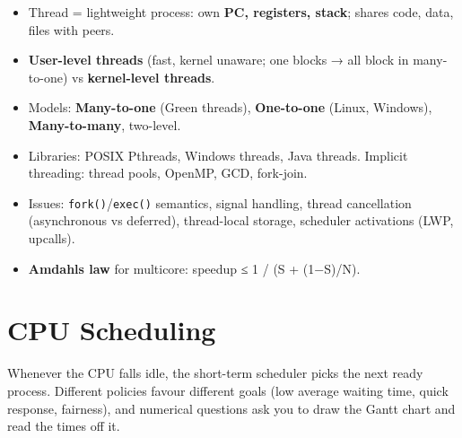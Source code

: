 \begin{itemize}
\tightlist
\item
  Thread = lightweight process: own \textbf{PC, registers, stack}; shares code, data, files with peers.
\item
  \textbf{User-level threads} (fast, kernel unaware; one blocks → all block in many-to-one) vs \textbf{kernel-level threads}.
\item
  Models: \textbf{Many-to-one} (Green threads), \textbf{One-to-one} (Linux, Windows), \textbf{Many-to-many}, two-level.
\item
  Libraries: POSIX Pthreads, Windows threads, Java threads. Implicit threading: thread pools, OpenMP, GCD, fork-join.
\item
  Issues: \texttt{fork()}/\texttt{exec()} semantics, signal handling, thread cancellation (asynchronous vs deferred), thread-local storage, scheduler activations (LWP, upcalls).
\item
  \textbf{Amdahl\textquotesingle s law} for multicore: speedup ≤ 1 / (S + (1−S)/N).
\end{itemize}

\needspace{125pt}

\hypertarget{p2-05--5-cpu-scheduling}{%
\section{CPU Scheduling}\label{p2-05--5-cpu-scheduling}}

Whenever the CPU falls idle, the short-term scheduler picks the next ready process. Different policies
favour different goals (low average waiting time, quick response, fairness), and numerical questions ask you
to draw the Gantt chart and read the times off it.



\begingroup\small

